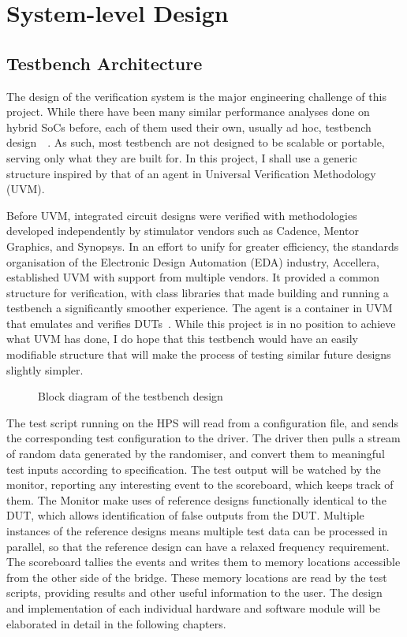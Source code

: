\section{System-level Design}

\subsection{Testbench Architecture}
The design of the verification system is the major engineering challenge of this project.
While there have been many similar performance analyses done on hybrid SoCs before, each of them used their own, usually ad hoc, testbench design~\cite{Shi1}~\cite{Li1}.
As such, most testbench are not designed to be scalable or portable, serving only what they are built for.
In this project, I shall use a generic structure inspired by that of an agent in Universal Verification Methodology (UVM).

Before UVM, integrated circuit designs were verified with methodologies developed independently by stimulator vendors such as Cadence, Mentor Graphics, and Synopsys.
In an effort to unify for greater efficiency, the standards organisation of the Electronic Design Automation (EDA) industry, Accellera, established UVM with support from multiple vendors.
It provided a common structure for verification, with class libraries that made building and running a testbench a significantly smoother experience.
The agent is a container in UVM that emulates and verifies DUTs~\cite{Accellera1}.
While this project is in no position to achieve what UVM has done, I do hope that this testbench would have an easily modifiable structure that will make the process of testing similar future designs slightly simpler.

\begin{figure}[H]
  \centering
  
  \caption{Block diagram of the testbench design}
  \label{Block}
\end{figure}

The test script running on the HPS will read from a configuration file, and sends the corresponding test configuration to the driver.
The driver then pulls a stream of random data generated by the randomiser, and convert them to meaningful test inputs according to specification.
The test output will be watched by the monitor, reporting any interesting event to the scoreboard, which keeps track of them.
The Monitor make uses of reference designs functionally identical to the DUT, which allows identification of false outputs from the DUT.
Multiple instances of the reference designs means multiple test data can be processed in parallel, so that the reference design can have a relaxed frequency requirement.
The scoreboard tallies the events and writes them to memory locations accessible from the other side of the bridge.
These memory locations are read by the test scripts, providing results and other useful information to the user.
The design and implementation of each individual hardware and software module will be elaborated in detail in the following chapters.

